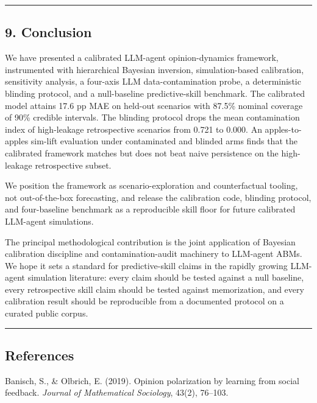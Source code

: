 \documentclass[
]{article}
\begin{document}
\begin{center}\rule{0.5\linewidth}{0.5pt}\end{center}

\subsection{9. Conclusion}\label{conclusion}

We have presented a calibrated LLM-agent opinion-dynamics framework,
instrumented with hierarchical Bayesian inversion, simulation-based
calibration, sensitivity analysis, a four-axis LLM data-contamination
probe, a deterministic blinding protocol, and a null-baseline
predictive-skill benchmark. The calibrated model attains 17.6 pp MAE on
held-out scenarios with 87.5\% nominal coverage of 90\% credible
intervals. The blinding protocol drops the mean contamination index of
high-leakage retrospective scenarios from 0.721 to 0.000. An
apples-to-apples sim-lift evaluation under contaminated and blinded arms
finds that the calibrated framework matches but does not beat naive
persistence on the high-leakage retrospective subset.

We position the framework as scenario-exploration and counterfactual
tooling, not out-of-the-box forecasting, and release the calibration
code, blinding protocol, and four-baseline benchmark as a reproducible
skill floor for future calibrated LLM-agent simulations.

The principal methodological contribution is the joint application of
Bayesian calibration discipline and contamination-audit machinery to
LLM-agent ABMs. We hope it sets a standard for predictive-skill claims
in the rapidly growing LLM-agent simulation literature: every claim
should be tested against a null baseline, every retrospective skill
claim should be tested against memorization, and every calibration
result should be reproducible from a documented protocol on a curated
public corpus.

\begin{center}\rule{0.5\linewidth}{0.5pt}\end{center}

\subsection{References}\label{references}

Banisch, S., \& Olbrich, E. (2019). Opinion polarization by learning
from social feedback. \emph{Journal of Mathematical Sociology}, 43(2),
76--103.
\end{document}
